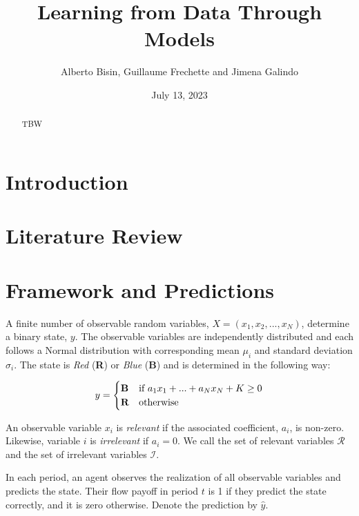 \documentclass[
  12pt,
]{article}
\title{Learning from Data Through Models}
\author{Alberto Bisin, Guillaume Frechette and Jimena Galindo}
\date{July 13, 2023}
\begin{document}
\maketitle
\begin{abstract}
TBW
\end{abstract}

\hypertarget{introduction}{%
\section{Introduction}\label{introduction}}

\hypertarget{literature-review}{%
\section{Literature Review}\label{literature-review}}

\hypertarget{framework-and-predictions}{%
\section{Framework and Predictions}\label{framework-and-predictions}}

A finite number of observable random variables,
\(X =(x_1, x_2, ..., x_N)\), determine a binary state, \(y\). The
observable variables are independently distributed and each follows a
Normal distribution with corresponding mean \(\mu_i\) and standard
deviation \(\sigma_i\). The state is \emph{Red} (\textbf{R}) or
\emph{Blue} (\textbf{B}) and is determined in the following way:

\begin{equation*}
y = \begin{cases}
\text{\textbf{B}} &\text{if $a_1x_1+...+a_Nx_N + K\geq0$}\\
\text{\textbf{R}} &\text{otherwise}
\end{cases}
\end{equation*}

An observable variable \(x_i\) is \emph{relevant} if the associated
coefficient, \(a_i\), is non-zero. Likewise, variable \(i\) is
\emph{irrelevant} if \(a_i = 0\). We call the set of relevant variables
\(\mathcal{R}\) and the set of irrelevant variables \(\mathcal{I}\).

In each period, an agent observes the realization of all observable
variables and predicts the state. Their flow payoff in period \(t\) is 1
if they predict the state correctly, and it is zero otherwise. Denote
the prediction by \(\hat{y}\).
\end{document}
